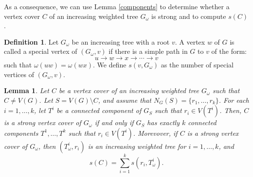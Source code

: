 \documentclass[12pt,amscd]{amsart}
\newtheorem{lem}[thm]{Lemma}
\theoremstyle{definition}
\newtheorem{defn}[thm]{Definition}
\begin{document}
As a consequence, we can use Lemma \ref{components} to determine  whether a vertex cover $C$ of an increasing weighted tree $G_\omega$ is strong and to compute $s(C)$.



\medskip

\begin{defn} Let $G_\omega$ be an increasing tree with a root $v$. A vertex $w$ of $G$ is called a special vertex of $(G_\omega,v)$ if there is a simple path in $G$ to $v$ of the form: $$u\to w\to x\to\cdots\to v$$ such that $\omega(uw)=\omega(wx)$.
We define $s(v,G_\omega)$  as the number of special vertices of $(G_\omega,v)$.
\end{defn}

\begin{lem}\label{strong-vc} Let $C$ be a vertex cover of an increasing weighted tree $G_\omega$ such that $C\ne V(G)$. Let $S = V(G)\setminus C$, and assume that $N_G(S) = \{r_1,\ldots,r_k\}$. For each $i=1,\ldots,k$, let $T^i$ be a connected component of $G_S$ such that $r_i\in V(T^i)$. Then, $C$ is a strong vertex cover of $G_\omega$ if and only if $G_S$ has exactly $k$ connected components $T^1,\ldots,T^k$ such that  $r_i\in V(T^i)$. Morevover, if $C$ is a strong vertex cover  of $G_\omega$, then  $(T^i_\omega, r_i)$ is an increasing weighted tree for $i=1,\ldots,k$, and
$$s(C) = \sum_{i=1}^k s(r_i, T^i_\omega).$$
\end{lem}
\end{document}
